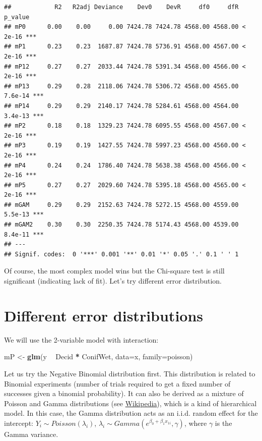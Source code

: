 \documentclass[12pt,]{book}
\newenvironment{Shaded}{\begin{snugshade}}{\end{snugshade}}
\newcommand{\DataTypeTok}[1]{\textcolor[rgb]{0.13,0.29,0.53}{#1}}
\newcommand{\KeywordTok}[1]{\textcolor[rgb]{0.13,0.29,0.53}{\textbf{#1}}}
\newcommand{\NormalTok}[1]{#1}
\newcommand{\OperatorTok}[1]{\textcolor[rgb]{0.81,0.36,0.00}{\textbf{#1}}}
\newcommand{\StringTok}[1]{\textcolor[rgb]{0.31,0.60,0.02}{#1}}
\begin{document}
\begin{verbatim}
##            R2   R2adj Deviance    Dev0    DevR     df0     dfR p_value    
## mP0      0.00    0.00     0.00 7424.78 7424.78 4568.00 4568.00 < 2e-16 ***
## mP1      0.23    0.23  1687.87 7424.78 5736.91 4568.00 4567.00 < 2e-16 ***
## mP12     0.27    0.27  2033.44 7424.78 5391.34 4568.00 4566.00 < 2e-16 ***
## mP13     0.29    0.28  2118.06 7424.78 5306.72 4568.00 4565.00 7.6e-14 ***
## mP14     0.29    0.29  2140.17 7424.78 5284.61 4568.00 4564.00 3.4e-13 ***
## mP2      0.18    0.18  1329.23 7424.78 6095.55 4568.00 4567.00 < 2e-16 ***
## mP3      0.19    0.19  1427.55 7424.78 5997.23 4568.00 4560.00 < 2e-16 ***
## mP4      0.24    0.24  1786.40 7424.78 5638.38 4568.00 4566.00 < 2e-16 ***
## mP5      0.27    0.27  2029.60 7424.78 5395.18 4568.00 4565.00 < 2e-16 ***
## mGAM     0.29    0.29  2152.63 7424.78 5272.15 4568.00 4559.00 5.5e-13 ***
## mGAM2    0.30    0.30  2250.35 7424.78 5174.43 4568.00 4539.00 8.4e-11 ***
## ---
## Signif. codes:  0 '***' 0.001 '**' 0.01 '*' 0.05 '.' 0.1 ' ' 1
\end{verbatim}

Of course, the most complex model wins
but the Chi-square test is still significant (indicating lack of fit).
Let's try different error distribution.

\hypertarget{different-error-distributions}{%
\section{Different error distributions}\label{different-error-distributions}}

We will use the 2-variable model with interaction:

\begin{Shaded}
\begin{Highlighting}[]
\NormalTok{mP <-}\StringTok{ }\KeywordTok{glm}\NormalTok{(y }\OperatorTok{~}\StringTok{ }\NormalTok{Decid }\OperatorTok{*}\StringTok{ }\NormalTok{ConifWet, }\DataTypeTok{data=}\NormalTok{x, }\DataTypeTok{family=}\NormalTok{poisson)}
\end{Highlighting}
\end{Shaded}

Let us try the Negative Binomial distribution first.
This distribution is related to Binomial experiments
(number of trials required to get a fixed number of successes
given a binomial probability). It can also be derived
as a mixture of Poisson and Gamma distributions
(see \href{https://en.wikipedia.org/wiki/Negative_binomial_distribution\#Gamma\%E2\%80\%93Poisson_mixture}{Wikipedia}),
which is a kind of hierarchical model.
In this case, the Gamma distribution acts as an i.i.d.
random effect for the intercept:
\(Y_i\sim Poisson(\lambda_i)\),
\(\lambda_i \sim Gamma(e^{\beta_0+\beta_1 x_{1i}}, \gamma)\),
where \(\gamma\) is the Gamma variance.
\end{document}
